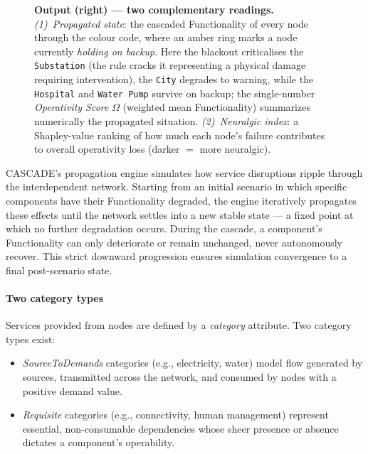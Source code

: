 \documentclass[review,12pt]{elsarticle}
\begin{document}
\begin{figure}[H]
{  %
  \textbf{Output (right) --- two complementary readings.}
  \emph{(1)~Propagated state}: the cascaded Functionality of every node through the colour code, where an amber ring marks a node currently \emph{holding on
  backup}. Here the blackout criticalises the \texttt{Substation} (the rule
  cracks it representing a physical damage requiring intervention), the \texttt{City} degrades to warning, while the \texttt{Hospital}
  and \texttt{Water Pump} survive on backup; the single-number \emph{Operativity
  Score} $\Omega$ (weighted mean Functionality) summarizes numerically the propagated situation.
  \emph{(2)~Neuralgic index}: a Shapley-value ranking of how much each node's failure contributes to overall operativity loss (darker $=$ more neuralgic).}
  \label{fig:anatomy}
\end{figure}

CASCADE's propagation engine simulates how service disruptions ripple through the interdependent network. Starting from an initial scenario in which specific components have their Functionality degraded, the engine iteratively propagates these effects until the network settles into a new stable state — a fixed point at which no further degradation occurs.
During the cascade, a component's Functionality can only deteriorate or remain unchanged, never autonomously recover. This strict downward progression ensures simulation convergence to a final post-scenario state.

\paragraph{Two category types}
Services provided from nodes are defined by a \textit{category} attribute.
Two category types exist:
\begin{itemize}
  \item \emph{SourceToDemands} categories (e.g., electricity, water) model flow generated by sources, transmitted across the network, and consumed by nodes with a positive demand value.
  \item \emph{Requisite} categories (e.g.,  connectivity, human
    management) represent essential, non-consumable dependencies whose sheer presence or absence dictates a component's operability.
\end{itemize}
\end{document}
